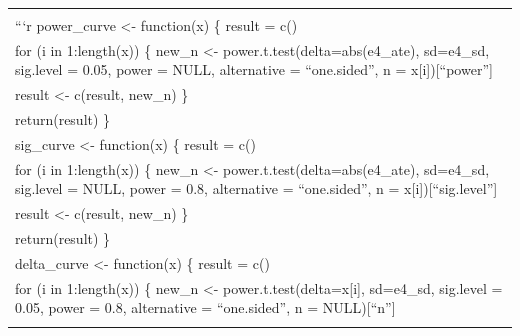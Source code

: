 \documentclass[
]{article}
\begin{document}
\begin{longtable}[]{@{}l@{}}
\begin{minipage}[t]{0.79\columnwidth}
\end{minipage}\tabularnewline
\begin{minipage}[t]{0.79\columnwidth}\raggedright
```r power\_curve \textless- function(x) \{ result = c()\strut
\end{minipage}\tabularnewline
\begin{minipage}[t]{0.79\columnwidth}\raggedright
for (i in 1:length(x)) \{ new\_n \textless-
power.t.test(delta=abs(e4\_ate), sd=e4\_sd, sig.level = 0.05, power =
NULL, alternative = ``one.sided'', n = x{[}i{]}){[}``power''{]}\strut
\end{minipage}\tabularnewline
\begin{minipage}[t]{0.79\columnwidth}\raggedright
result \textless- c(result, new\_n) \}\strut
\end{minipage}\tabularnewline
\begin{minipage}[t]{0.79\columnwidth}\raggedright
return(result) \}\strut
\end{minipage}\tabularnewline
\begin{minipage}[t]{0.79\columnwidth}\raggedright
sig\_curve \textless- function(x) \{ result = c()\strut
\end{minipage}\tabularnewline
\begin{minipage}[t]{0.79\columnwidth}\raggedright
for (i in 1:length(x)) \{ new\_n \textless-
power.t.test(delta=abs(e4\_ate), sd=e4\_sd, sig.level = NULL, power =
0.8, alternative = ``one.sided'', n = x{[}i{]}){[}``sig.level''{]}\strut
\end{minipage}\tabularnewline
\begin{minipage}[t]{0.79\columnwidth}\raggedright
result \textless- c(result, new\_n) \}\strut
\end{minipage}\tabularnewline
\begin{minipage}[t]{0.79\columnwidth}\raggedright
return(result) \}\strut
\end{minipage}\tabularnewline
\begin{minipage}[t]{0.79\columnwidth}\raggedright
delta\_curve \textless- function(x) \{ result = c()\strut
\end{minipage}\tabularnewline
\begin{minipage}[t]{0.79\columnwidth}\raggedright
for (i in 1:length(x)) \{ new\_n \textless- power.t.test(delta=x{[}i{]},
sd=e4\_sd, sig.level = 0.05, power = 0.8, alternative = ``one.sided'', n
= NULL){[}``n''{]}\strut
\end{minipage}\tabularnewline
\begin{minipage}[t]{0.79\columnwidth}\raggedright

\end{minipage}
\end{longtable}
\end{document}
